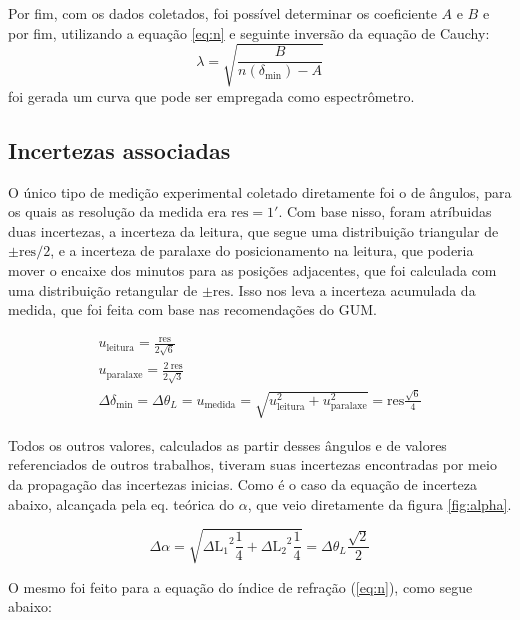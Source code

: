 Por fim, com os dados coletados, foi possível determinar os coeficiente $A$ e $B$ e por fim, utilizando a equação \ref{eq:n} e seguinte inversão da equação de Cauchy:
\begin{equation}
    \lambda = \sqrt{\frac{B}{n\left(\delta_\text{min}\right)-A}}
    \label{eq:lambda}
\end{equation}
foi gerada um curva que pode ser empregada como espectrômetro.


\subsection{Incertezas associadas}

O único tipo de medição experimental coletado diretamente foi o de ângulos, para os quais as resolução da medida era $\text{res}=\ang{;1;}$. Com base nisso, foram atríbuidas duas incertezas, a incerteza da leitura, que segue uma distribuição triangular de $\pm\text{res}/2$, e a incerteza de paralaxe do posicionamento na leitura, que poderia mover o encaixe dos minutos para as posições adjacentes, que foi calculada com uma distribuição retangular de $\pm\text{res}$. Isso nos leva a incerteza acumulada da medida, que foi feita com base nas recomendações do GUM\cite{ref:gum}.

\begin{gather*}
    u_{\text{leitura}} = \frac{\text{res}}{2 \sqrt{6}} \\
    u_{\text{paralaxe}} = \frac{2\ \text{res}}{2 \sqrt{3}} \\
    \Delta{\delta_{\text{min}}} = \Delta\theta_L = u_{\text{medida}}
        = \sqrt{u_{\text{leitura}}^2 + u_{\text{paralaxe}}^2}
        = \text{res} \frac{\sqrt{6}}{4}
\end{gather*}

Todos os outros valores, calculados as partir desses ângulos e de valores referenciados de outros trabalhos, tiveram suas incertezas encontradas por meio da propagação das incertezas inicias. Como é o caso da equação de incerteza abaixo, alcançada pela eq. teórica do $\alpha$, que veio diretamente da figura \ref{fig:alpha}.

\begin{equation*}
    \Delta{\alpha} = \sqrt{{\Delta{\text{L}_1}}^2\frac{1}{4} + {\Delta{\text{L}_2}}^2\frac{1}{4}} = \Delta\theta_L \frac{\sqrt{2}}{2}
\end{equation*}

O mesmo foi feito para a equação do índice de refração (\ref{eq:n}), como segue abaixo:

